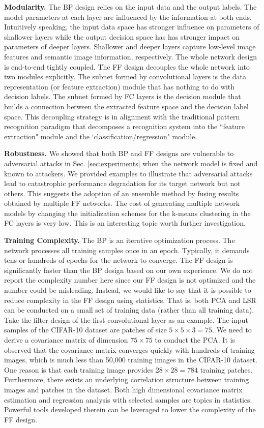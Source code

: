 \documentclass[preprint,12pt]{elsarticle}
\begin{document}
{\bf Modularity.} The BP design relies on the input data and the output
labels. The model parameters at each layer are influenced by the
information at both ends. Intuitively speaking, the input data space has
stronger influence on parameters of shallower layers while the output
decision space has has stronger impact on parameters of deeper layers.
Shallower and deeper layers capture low-level image features and
semantic image information, respectively. The whole network design is
end-to-end tightly coupled. The FF design decouples the whole network
into two modules explicitly. The subnet formed by convolutional layers
is the data representation (or feature extraction) module that has
nothing to do with decision labels. The subnet formed by FC layers is
the decision module that builds a connection between the extracted
feature space and the decision label space. This decoupling strategy is
in alignment with the traditional pattern recognition paradigm that
decomposes a recognition system into the ``feature extraction" module
and the `classification/regression" module. 

{\bf Robustness.} We showed that both BP and FF designs are vulnerable
to adversarial attacks in Sec. \ref{sec:experiments} when the network
model is fixed and known to attackers. We provided examples to
illustrate that adversarial attacks lead to catastrophic performance
degradation for its target network but not others.  This suggests the
adoption of an ensemble method by fusing results obtained by multiple FF
networks.  The cost of generating multiple network models by changing
the initialization schemes for the k-means clustering in the FC layers
is very low. This is an interesting topic worth further investigation. 

{\bf Training Complexity.} The BP is an iterative optimization process.
The network processes all training samples once in an epoch.  Typically,
it demands tens or hundreds of epochs for the network to converge. The
FF design is significantly faster than the BP design based on our own
experience. We do not report the complexity number here since our FF
design is not optimized and the number could be misleading.  Instead, we
would like to say that it is possible to reduce complexity in the FF
design using statistics. That is, both PCA and LSR can be conducted on a
small set of training data (rather than all training data). Take the
filter design of the first convolutional layer as an example. The input
samples of the CIFAR-10 dataset are patches of size $5 \times 5 \times 3
=75$. We need to derive a covariance matrix of dimension $75 \times 75$
to conduct the PCA.  It is observed that the covariance matrix converges
quickly with hundreds of training images, which is much less than 50,000
training images in the CIFAR-10 dataset. One reason is that each
training image provides $28 \times 28=784$ training patches.
Furthermore, there exists an underlying correlation structure between
training images and patches in the dataset. Both high dimensional
covariance matrix estimation \cite{fan2008high} and regression analysis
with selected samples \cite{cameron2013regression} are topics in
statistics. Powerful tools developed therein can be leveraged to lower
the complexity of the FF design. 
\end{document}
